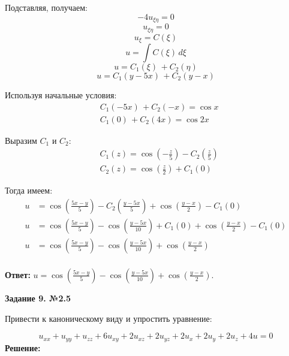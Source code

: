 \documentclass[a4paper,12pt]{article}
\begin{document}
Подставляя, получаем:
\begin{equation*}
    -4u_{\xi\eta} = 0
\end{equation*}
\begin{equation*}
    u_{\xi\eta} = 0
\end{equation*}
\begin{equation*}
    u_{\xi} = C(\xi)
\end{equation*}
\begin{equation*}
    u = \int C(\xi) \, d\xi
\end{equation*}
\begin{equation*}
    u = C_1(\xi) \, + C_2(\eta)
\end{equation*}
\begin{equation*}
    u = C_1(y-5x) \, + C_2(y-x)
\end{equation*}

Используя начальные условия:
\begin{align*}
    &C_1(-5x) \, + C_2(-x) = \cos x \\
    &C_1(0) \, + C_2(4x) = \cos 2x
\end{align*}

Выразим $C_1$ и $C_2$:
\begin{align*}
    &C_1(z)=\cos (-\frac{z}{5}) - C_2(\frac{z}{5})\\
    &C_2(z) = \cos (\frac{z}{2}) + C_1(0)
\end{align*}

Тогда имеем:
\begin{align*}
    u &=\cos (\frac{5x-y}{5}) - C_2(\frac{y-5x}{5}) + \cos (\frac{y-x}{2}) - C_1(0)\\
    u &=\cos (\frac{5x-y}{5}) - \cos (\frac{y-5x}{10}) +C_1(0) + \cos (\frac{y-x}{2}) - C_1(0)\\
    u &=\cos (\frac{5x-y}{5}) - \cos (\frac{y-5x}{10}) + \cos (\frac{y-x}{2}) \\
\end{align*}

\textbf{Ответ:} $u =\cos (\frac{5x-y}{5}) - \cos (\frac{y-5x}{10}) + \cos (\frac{y-x}{2})$.

\vspace{90mm}
\begin{center}    
    \textbf{Задание 9. №2.5}
\end{center}

Привести к каноническому виду и упростить уравнение:

\begin{equation*}
    u_{xx} + u_{yy} + u_{zz} + 6u_{xy} + 2u_{xz} + 2u_{yz} + 2u_{x} + 2u_{y} + 2u_{z} + 4u = 0
\end{equation*}
\textbf{Решение:}
\end{document}
